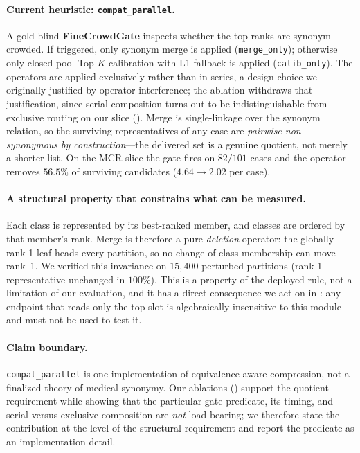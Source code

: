 \paragraph{Current heuristic: \texttt{compat\_parallel}.}
A gold-blind \textbf{FineCrowdGate} inspects whether the top ranks are synonym-crowded.
If triggered, only synonym merge is applied (\texttt{merge\_only}); otherwise only closed-pool Top-$K$ calibration with L1 fallback is applied (\texttt{calib\_only}).
The operators are applied exclusively rather than in series, a design choice we originally justified by operator interference; the ablation withdraws that justification, since serial composition turns out to be indistinguishable from exclusive routing on our slice ().
Merge is single-linkage over the synonym relation, so the surviving representatives of any case are \emph{pairwise non-synonymous by construction}---the delivered set is a genuine quotient, not merely a shorter list.
On the MCR slice the gate fires on $82/101$ cases and the operator removes $56.5\%$ of surviving candidates ($4.64 \rightarrow 2.02$ per case).

\paragraph{A structural property that constrains what can be measured.}
Each class is represented by its best-ranked member, and classes are ordered by that member's rank.
Merge is therefore a pure \emph{deletion} operator: the globally rank-1 leaf heads every partition, so no change of class membership can move rank~1.
We verified this invariance on $15{,}400$ perturbed partitions (rank-1 representative unchanged in $100\%$).
This is a property of the deployed rule, not a limitation of our evaluation, and it has a direct consequence we act on in : any endpoint that reads only the top slot is algebraically insensitive to this module and must not be used to test it.

\paragraph{Claim boundary.}
\texttt{compat\_parallel} is one implementation of equivalence-aware compression, not a finalized theory of medical synonymy.
Our ablations () support the quotient requirement while showing that the particular gate predicate, its timing, and serial-versus-exclusive composition are \emph{not} load-bearing; we therefore state the contribution at the level of the structural requirement and report the predicate as an implementation detail.

